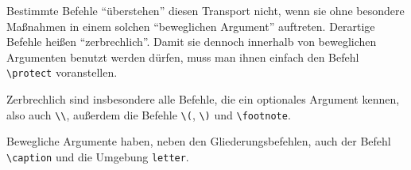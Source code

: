 Bestimmte Befehle "`überstehen"' diesen Transport nicht, wenn sie
ohne besondere Maßnahmen in einem solchen "`beweglichen Argument"'
auftreten.
Derartige Befehle heißen "`zerbrechlich"'.  Damit sie dennoch innerhalb
von beweglichen Argumenten benutzt werden dürfen, 
muss man ihnen einfach den Befehl \lstinline|\protect| voranstellen.

Zerbrechlich sind insbesondere alle Befehle, die ein optionales Argument
kennen, also auch \lstinline|\\|,
außerdem die Befehle \lstinline|\(|, \lstinline|\)| und \lstinline|\footnote|.

Bewegliche Argumente haben, neben den Gliederungsbefehlen,
auch der Befehl \lstinline|\caption| und die Umgebung \texttt{letter}.


\endinput
